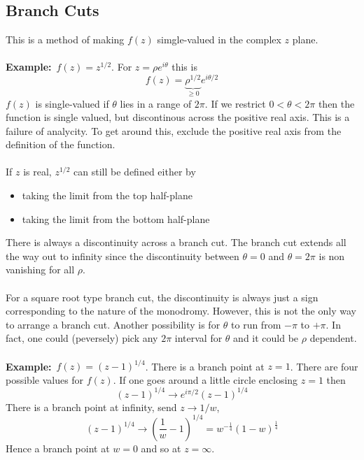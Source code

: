 \documentclass{article}
\newcommand{\example}{\textbf{Example:}}
\begin{document}
\subsection*{Branch Cuts}
This is a method of making $f(z)$ simgle-valued in the complex $z$ plane.
\\
\\
\example\ $f(z) = z^{1/2} $. For $z = \rho e^{i\theta}$ this is
\[f(z) = \underbrace{\rho^{1/2}}_{\geq 0} e^{i\theta/2} \]
$f(z)$ is single-valued if $\theta$ lies in a range of $2\pi$.
If we restrict $0 < \theta < 2\pi$ then the function is single valued, 
but discontinous across the positive real axis. This is a failure of 
analycity.
To get around this, exclude the positive real axis from the definition of the
function.
\\
\\
If $z$ is real, $z^{1/2}$ can still be defined either by
\begin{itemize}
\item taking the limit from the top half-plane
\item taking the limit from the bottom half-plane
\end{itemize}
There is always a discontinuity across a branch cut. The branch cut extends
all the way out to infinity since the discontinuity between $\theta =0$ and
$\theta = 2 \pi$ is non vanishing for all $\rho$.
\\
\\
For a square root type branch cut, the discontinuity is always just a sign 
corresponding to the nature of the monodromy. However, this is not the only
way to arrange a branch cut. Another possibility is for $\theta$ to run from
$-\pi$ to $+\pi$. In fact, one could (peversely) pick any $2\pi$ interval for
$\theta$ and it could be $\rho$ dependent.
\\
\\
\example\ $f(z) = (z-1)^{1/4} $. There is a branch point at $z=1$. There are
four possible values for $f(z)$. If one goes around a little circle enclosing
$z=1$ then
\[ (z-1)^{1/4} \to e^{i\pi /2} (z-1)^{1/4}\] 
There is a branch point at infinity, send $z \to 1/w$,
\[ (z-1)^{1/4} \to \left( \frac{1}{w} -1 \right) ^{1/4} =
w^{-\frac{1}{4}} ( 1-w)^{\frac{1}{4}} \]
Hence a branch point at $w=0$ and so at $z=\infty$.
\end{document}
